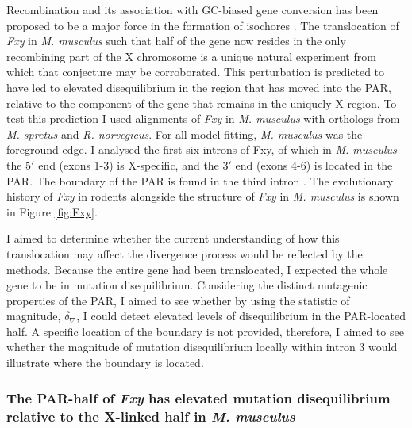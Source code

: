 Recombination and its association with GC-biased gene conversion has been proposed to be a major force in the formation of isochores \citep{Montoya-Burgos2003RecombinationGenomes}. The translocation of \textit{Fxy} in \textit{M. musculus} such that half of the gene now resides in the only recombining part of the X chromosome is a unique natural experiment from which that conjecture may be corroborated. This perturbation is predicted to have led to elevated disequilibrium in the region that has moved into the PAR, relative to the component of the gene that remains in the uniquely X region. To test this prediction I used alignments of \textit{Fxy} in \textit{M. musculus} with orthologs from \textit{M. spretus} and \textit{R. norvegicus}. For all model fitting, \textit{M. musculus} was the foreground edge. I analysed the first six introns of Fxy, of which in \textit{M. musculus} the $5'$ end (exons 1-3) is X-specific, and the $3'$ end (exons 4-6) is located in the PAR. The boundary of the PAR is found in the third intron \citep{Palmer1997AMice}. The evolutionary history of \textit{Fxy} in rodents alongside the structure of \textit{Fxy} in \textit{M. musculus} is shown in Figure \ref{fig:Fxy}. 

I aimed to determine whether the current understanding of how this translocation may affect the divergence process would be reflected by the methods. Because the entire gene had been translocated, I expected the whole gene to be in mutation disequilibrium. Considering the distinct mutagenic properties of the PAR, I aimed to see whether by using the statistic of magnitude, $\delta_\nabla$, I could detect elevated levels of disequilibrium in the PAR-located half. A specific location of the boundary is not provided, therefore, I aimed to see whether the magnitude of mutation disequilibrium locally within intron 3 would illustrate where the boundary is located. 



\subsubsection{The PAR-half of \textit{Fxy} has elevated mutation disequilibrium relative to the X-linked half in \textit{M. musculus}}

